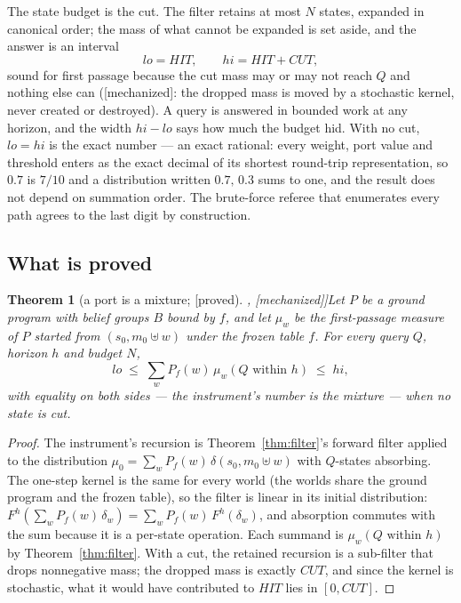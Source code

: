\documentclass[11pt]{article}
\newcommand{\stproved}{[\textsf{proved}]}
\newcommand{\stmech}{[\textsf{mechanized}]}
\theoremstyle{plain}
\newtheorem{theorem}{Theorem}
\theoremstyle{definition}
\theoremstyle{remark}
\begin{document}
The state budget is the cut. The filter retains at most $N$ states,
expanded in canonical order; the mass of what cannot be expanded is set
aside, and the answer is an interval
\[
  \mathit{lo} = \mathit{HIT}, \qquad
  \mathit{hi} = \mathit{HIT} + \mathit{CUT},
\]
sound for first passage because the cut mass may or may not reach $Q$
and nothing else can (\stmech{}: the dropped mass is moved by a
stochastic kernel, never created or destroyed). A query is answered in
bounded work at any horizon, and the width $\mathit{hi} - \mathit{lo}$ says how much the
budget hid. With no cut, $\mathit{lo} = \mathit{hi}$ is the exact
number --- an exact rational: every weight, port value and threshold
enters as the exact decimal of its shortest round-trip representation,
so $0.7$ is $7/10$ and a distribution written $0.7,\,0.3$ sums to one,
and the result does not depend on summation order. The brute-force
referee that enumerates every path agrees to the last digit by
construction.

\subsection{What is proved}\label{sec:beliefthm}

\begin{theorem}[a port is a mixture; \stproved{}, \stmech{}]\label{thm:mixture}
Let $P$ be a ground program with belief groups $B$ bound by $f$, and let
$\mu_w$ be the first-passage measure of $P$ started from
$(s_0, m_0 \uplus w)$ under the frozen table $f$. For every query $Q$,
horizon $h$ and budget $N$,
\[
  \mathit{lo} \;\le\; \sum_w P_f(w)\,\mu_w(Q \text{ within } h) \;\le\;
  \mathit{hi},
\]
with equality on both sides --- the instrument's number is the mixture
--- when no state is cut.
\end{theorem}

\begin{proof}
The instrument's recursion is Theorem~\ref{thm:filter}'s forward filter
applied to the distribution $\mu_0 = \sum_w P_f(w)\,\delta(s_0, m_0
\uplus w)$ with $Q$-states absorbing. The one-step kernel is the same
for every world (the worlds share the ground program and the frozen
table), so the filter is linear in its initial distribution:
$F^h(\sum_w P_f(w)\,\delta_w) = \sum_w P_f(w)\,F^h(\delta_w)$, and
absorption commutes with the sum because it is a per-state operation.
Each summand is $\mu_w(Q \text{ within } h)$ by
Theorem~\ref{thm:filter}. With a cut, the retained recursion is a
sub-filter that drops nonnegative mass; the dropped mass is exactly
$\mathit{CUT}$, and since the kernel is stochastic, what it would have
contributed to $\mathit{HIT}$ lies in $[0, \mathit{CUT}]$.
\end{proof}
\end{document}
